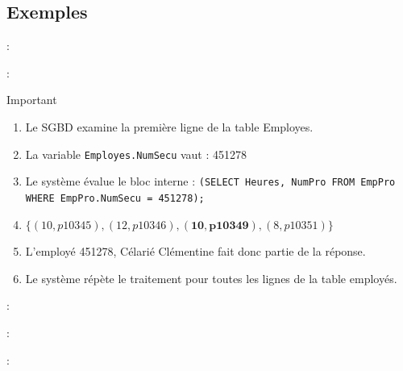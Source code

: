 \documentclass[10pt]{beamer}
\begin{document}
\subsection{Exemples}
\begin{frame}{\secname : \subsecname}
    
\end{frame}


\begin{frame}{\secname : \subsecname}
    \begin{alertblock}{Important}
        \begin{enumerate}
            \item Le SGBD examine la première ligne de la table Employes.
            \item La variable \lstinline[language=plsql]!Employes.NumSecu! vaut : 451278
            \item Le système évalue le bloc interne : \lstinline[language=plsql]!(SELECT Heures, NumPro FROM EmpPro WHERE EmpPro.NumSecu = 451278);!
            \item $\{(10, p10345), (12, p10346), \boldsymbol{(10, p10349)}, (8, p10351)\}$
            \item L'employé 451278, Célarié Clémentine fait donc partie de la réponse.
            \item Le système répète le traitement pour toutes les lignes de la table employés.
        \end{enumerate}
    \end{alertblock}
\end{frame}

\begin{frame}{\secname : \subsecname}
    
\end{frame}

\begin{frame}{\secname : \subsecname}
    
\end{frame}

\begin{frame}{\secname : \subsecname}
    
\end{frame}
\end{document}
